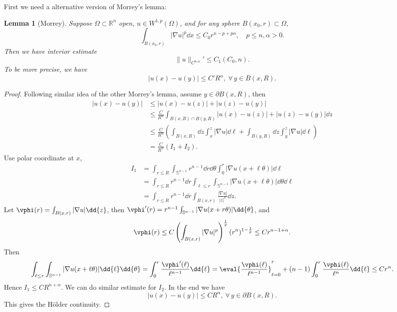 \documentclass[UTF8,12pt]{article}
\theoremstyle{plain}\newtheorem{theorem}{Theorem}
\theoremstyle{definition}\newtheorem{definition}[theorem]{Definition}
\theoremstyle{definition}\newtheorem{example}[theorem]{Example}
\theoremstyle{plain}\newtheorem{axiom}[theorem]{Axiom}
\theoremstyle{plain}\newtheorem{assertion}[theorem]{Assertion}
\theoremstyle{plain}\newtheorem{corollary}[theorem]{Corollary}
\theoremstyle{plain}\newtheorem{lemma}[theorem]{Lemma}
\theoremstyle{plain}\newtheorem{proposition}[theorem]{Proposition}
\theoremstyle{plain}\newtheorem{prop}[theorem]{Proposition}
\theoremstyle{plain}\newtheorem{conjecture}[theorem]{Conjecture}
\theoremstyle{plain}\newtheorem{conj}[theorem]{Conjecture}
\theoremstyle{plain}\newtheorem{problem}[theorem]{Problem}
\theoremstyle{remark}\newtheorem{notation}[theorem]{Notation}
\theoremstyle{definition}\newtheorem*{question}{Question}
\theoremstyle{definition}\newtheorem*{answer}{Answer}
\theoremstyle{definition}\newtheorem*{goal}{Goal}
\theoremstyle{plain}\newtheorem*{application}{Application}
\theoremstyle{plain}\newtheorem*{exercise}{Exercise}
\theoremstyle{remark}\newtheorem*{remark}{Remark}
\theoremstyle{remark}\newtheorem*{note}{\small{Note}}
\numberwithin{equation}{section}
\numberwithin{theorem}{section}
\numberwithin{figure}{section}
\begin{document}
First we need a alternative version of Morrey's lemma:
\begin{lemma}[Morrey]
    Suppose \(\Omega\subset \mathbb{R}^n\) open, \(u\in W^{1,p}(\Omega)\), and for any
    sphere \(B(x_0,r)\subset \Omega\), \[
        \int_{B(x_0,r)}|\nabla u|^p \dd{x}\le C_0r^{n-p+p\alpha},
        \quad p\le n,\alpha>0
    .\] Then we have interior estimate \[
        \|u\|_{C^{0,\alpha}}'\le C_1(C_0,n)
    .\] To be more precise, we have \[
        |u(x)-u(y)|\le C'R^{\alpha},\ \forall\,y\in \overline{B}(x,R)
    .\] 
\end{lemma}
\begin{proof}
    Following similar idea of the other Morrey's lemma, assume \(y\in \partial
    B(x,R)\), then
    \begin{align*}
        |u(x)-u(y)|&\le |u(x)-u(z)|+|u(z)-u(y)| \\
        &\le \frac{C}{R^n}\int_{B(x,R)\cap B(y,R)}
        |u(x)-u(z)|+|u(z)-u(y)|\dd{z} \\
        &\le\frac{C}{R^n}\left(\int_{B(x,R)}\dd{z}\int_x^z|\nabla u|\dd{\ell}
        +\int_{B(y,R)}\dd{z}\int_{y}^{z}|\nabla u|\dd{\ell}\right) \\
        &=\frac{C}{R^n}(I_1+I_2)
    .\end{align*}
    Use polar coordinate at \(x\),
    \begin{align*}
        I_1&=\int_{r\le R}\int_{\mathbb{S}^{n-1}}r^{n-1}\dd{r}\dd{\theta}
        \int_{0}^{r}|\nabla u(x+\ell\theta)|\dd{\ell} \\
        &=\int_{r\le R}r^{n-1}\dd{r}\int_{\ell\le r}
        \int_{\mathbb{S}^{n-1}}|\nabla u(x+\ell\theta)|\dd{\theta}\dd{\ell} \\
        &=\int_{r\le R}r^{n-1}\dd{r}\int_{B(x,r)}\frac{|\nabla u|}{|z|^n}\dd{z}
    .\end{align*}
    Let \(\vphi(r)=\int_{B(x,r)}|\nabla u|\dd{z}\), then \(\vphi'(r)=r^{n-1}
    \int_{\mathbb{S}^{n-1}}|\nabla u (x+r\theta)|\dd{\theta}\), and \[
        \vphi(r)\le C\left(\int_{B(x,r)}|\nabla u|^{p}\right)^{\frac{1}{p}}
        (r^n)^{1-\frac{1}{p}}\le Cr^{n-1+\alpha}
    .\] Then \[
        \int_{\ell\le r}\int_{\mathbb{S}^{n-1}}|\nabla u(x+\ell\theta)|\dd{\ell}
        \dd{\theta}=\int_{0}^{r}\frac{\vphi'(\ell)}{\ell^{n-1}}\dd{\ell}
        =\eval{\frac{\vphi(\ell)}{\ell^{n-1}}}_{\ell=0}^r
        +(n-1)\int_{0}^{r}\frac{\vphi(\ell)}{\ell^n}\dd{\ell}\le Cr^\alpha
    .\] Hence \(I_1\le CR^{n+\alpha}\). We can do similar estimate for \(I_2\).
    In the end we have \[
        |u(x)-u(y)|\le CR^{\alpha},\ \forall\,y\in \partial B(x,R)
    .\] This gives the H\"older continuity.
\end{proof}
\end{document}
